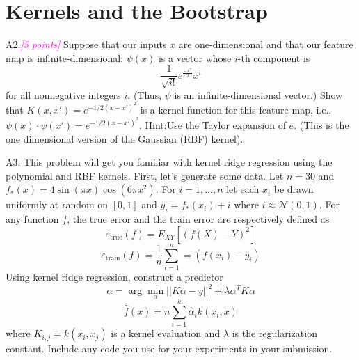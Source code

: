 \documentclass{article}
\newcommand{\argmin}{\arg\!\min}
\newcommand{\1}{\mathbf{1}}
\newcommand{\N}{\mathcal{N}} %
\newcommand{\points}[1]{\small\textcolor{magenta}{\emph{[#1 points]}} \normalsize}
\begin{document}
\newpage
\section*{Kernels and the Bootstrap}
A2.\points{5} Suppose that our inputs $x$ are one-dimensional and that our feature map is infinite-dimensional: $\psi(x)$ is a vector whose $i$-th component is 
$$\frac{1}{\sqrt{i!}}e^{\frac{-x^2}{2}}x^i$$
for all nonnegative integers $i$. (Thus, $\psi$ is an infinite-dimensional vector.) Show that $K(x,x') =e^{-1/2(x-x')^2}$ is a kernel function for this feature map, i.e., $\psi(x)\cdot \psi(x') = e^{-1/2(x-x')^2}$. Hint:Use the Taylor expansion of $e$. (This is the one dimensional version of the Gaussian (RBF) kernel).


\newpage
A3. This problem will get you familiar with kernel ridge regression using the polynomial and RBF kernels. First, let’s generate some data. Let $n=30$ and $f_*(x)=4\sin(\pi x)\cos(6\pi x^2)$. For $i= 1,\hdots,n$ let each $x_i$ be drawn uniformly at random on $[0,1]$ and $y_i=f_*(x_i) + i$ where $i\approx\N(0,1)$. For any function $f$, the true error and the train error are respectively defined as 
$$\varepsilon_{\text{true}} (f) = E_{XY} [(f(X)-Y)^2]$$
$$\varepsilon_{\text{train}} (f) =\frac{1}{n}\sum_{i=1}^n = (f(x_i) - y_i)$$
Using kernel ridge regression, construct a predictor 
$$\alpha = \argmin_\alpha ||K\alpha - y||^2 + \lambda\alpha^TK\alpha$$
$$\hat f(x) = n\sum_{i=1}^k \widehat\alpha_i k(x_i,x)$$
where $K_{i,j}=k(x_i,x_j)$ is a kernel evaluation and $\lambda$ is the regularization constant. Include any code you use for your experiments in your submission.
\end{document}
